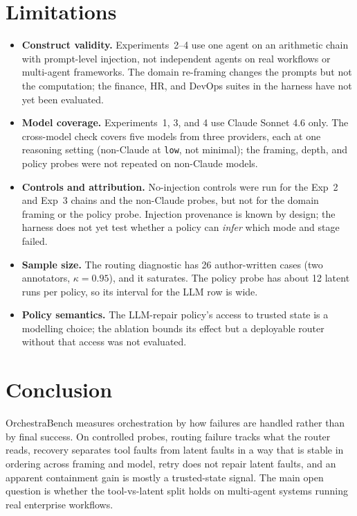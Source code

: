 \documentclass[11pt,a4paper]{article}
\begin{document}
\section{Limitations}
\label{sec:limitations}
\begin{itemize}
  \item \textbf{Construct validity.} Experiments~2--4 use one agent on an
  arithmetic chain with prompt-level injection, not independent agents on
  real workflows or multi-agent frameworks.
  The domain re-framing changes the prompts but not the computation; the
  finance, HR, and DevOps suites in the harness have not yet been evaluated.
  \item \textbf{Model coverage.} Experiments~1, 3, and 4 use Claude Sonnet 4.6
  only. The cross-model check covers five models from three providers, each at
  one reasoning setting (non-Claude at \texttt{low}, not minimal); the
  framing, depth, and policy probes were not repeated on non-Claude models.
  \item \textbf{Controls and attribution.} No-injection controls were run for
  the Exp~2 and Exp~3 chains and the non-Claude probes, but not for the domain
  framing or the policy probe. Injection provenance is known by design; the
  harness does not yet test whether a policy can \emph{infer} which mode and
  stage failed.
  \item \textbf{Sample size.} The routing diagnostic has 26 author-written
  cases (two annotators, $\kappa{=}0.95$), and it saturates. The policy probe
  has about 12 latent runs per policy, so its interval for the LLM row is wide.
  \item \textbf{Policy semantics.} The LLM-repair policy's access to trusted state is a
  modelling choice; the ablation bounds its effect but a deployable router
  without that access was not evaluated.
\end{itemize}

\section{Conclusion}
\label{sec:conclusion}
OrchestraBench measures orchestration by how failures are handled rather than by
final success. On controlled probes, routing failure tracks what the router
reads, recovery separates tool faults from latent faults in a way that is
stable in ordering across framing and model, retry does not repair latent
faults, and an apparent containment gain is mostly a trusted-state signal. The
main open question is whether the tool-vs-latent split holds on multi-agent
systems running real enterprise workflows.
\end{document}
